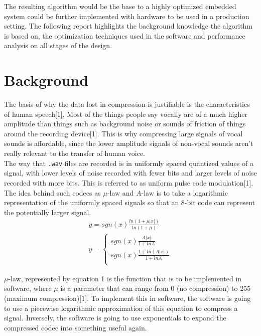 \documentclass[12pt]{article}
\begin{document}
The resulting algorithm would be the base to a highly optimized embedded system could be further implemented with hardware to be used in a production setting. The following report highlights the background knowledge the algorithm is based on, the optimization techniques used in the software and performance analysis on all stages of the design.\\
 
\section{Background}

The basis of why the data lost in compression is justifiable is the characteristics of human speech[1]. Most of the things people say vocally are of a much higher amplitude than things such as background noise or sounds of friction of things around the recording device[1]. This is why compressing large signals of vocal sounds is affordable, since the lower amplitude signals of non-vocal sounds aren't really relevant to the transfer of human voice. \\

The way that \texttt{.wav} files are recorded is in uniformly spaced quantized values of a signal, with lower levels of noise recorded with fewer bits and larger levels of noise recorded with more bits. This is referred to as uniform pulse code modulation[1]. The idea behind such codecs as $\mu$-law and $A$-law is to take a logarithmic representation of the uniformly spaced signals so that an 8-bit code can represent the potentially larger signal. \\

\begin{align}
y = sgn(x)\frac{ln(1+\mu|x|)}{ln(1+ \mu)}\\
y = \begin{cases}
sgn(x)\frac{A|x|}{1+ln A} \\
sgn(x)\frac{1+ln(A|x|)}{1 + ln A}\\
\end{cases}
\end{align}

$\mu$-law, represented by equation 1 is the function that is to be implemented in software, where $\mu$ is a parameter that can range from 0 (no compression) to 255 (maximum compression)[1]. To implement this in software, the software is going to use a piecewise logarithmic approximation of this equation to compress a signal. Inversely, the software is going to use exponentials to expand the compressed codec into something useful again. \\
\end{document}
